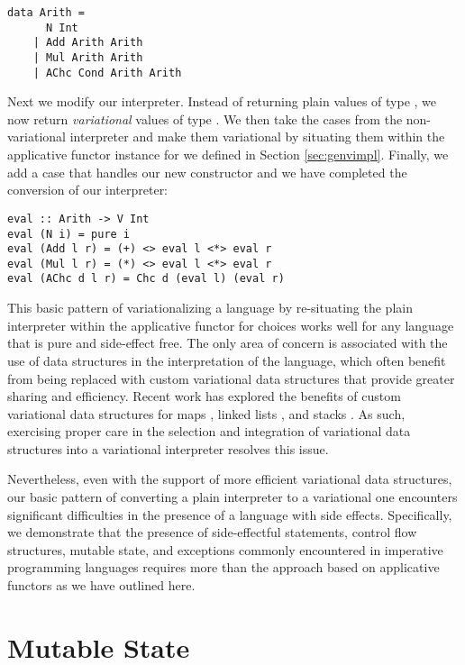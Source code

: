 \documentclass[12pt,oneside]{book}
\begin{document}
\begin{lstlisting}
data Arith =
      N Int
    | Add Arith Arith
    | Mul Arith Arith
    | AChc Cond Arith Arith
\end{lstlisting}

Next we modify our interpreter. Instead of returning plain values of type ,
we now return \emph{variational} values of type . We then take the cases
from the non-variational interpreter and make them variational by situating them within the
applicative functor instance for  we defined in Section \ref{sec:genvimpl}. Finally, we add a case
that handles our new  constructor and we have completed the conversion of our
interpreter:

\begin{lstlisting}
eval :: Arith -> V Int
eval (N i) = pure i
eval (Add l r) = (+) <> eval l <*> eval r
eval (Mul l r) = (*) <> eval l <*> eval r
eval (AChc d l r) = Chc d (eval l) (eval r)
\end{lstlisting}

This basic pattern of variationalizing a language by re-situating the
plain interpreter within the applicative functor for choices works well for any language that is pure
and side-effect free. The only area of concern is associated with the use of data structures in the
interpretation of the language, which often benefit from being replaced with custom variational data structures that
provide greater sharing and efficiency. Recent work has explored the benefits of custom variational
data structures for maps \cite{Walk14onward}, linked lists \cite{lists}, and stacks \cite{MMWWK17vamos}.
As such, exercising proper care in the selection and integration of variational data structures
into a variational interpreter resolves this issue.

Nevertheless, even with the support of more efficient
variational data structures, our basic pattern of converting a plain interpreter to a variational one
encounters significant difficulties in the presence of a language with side effects. Specifically, we
demonstrate that the presence of side-effectful statements, control flow structures, mutable state, and exceptions
commonly encountered in imperative programming languages requires more than the approach based
on applicative functors as we have outlined here.

\section{Mutable State}
\label{sec:mutst}
\end{document}
